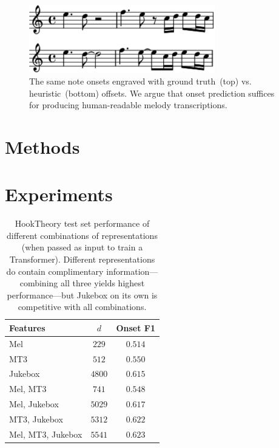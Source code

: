 \documentclass{article}
\newcommand{\mel}{Mel}
\newcommand{\mtthree}{MT3}
\newcommand{\jukebox}{Jukebox}
\newcommand{\hooktheory}{HookTheory}
\begin{document}
\begin{figure}
    \centering
    \includegraphics[width=8.1cm]{figs/heuristic_offsets.pdf}
    \caption{
The same note onsets engraved with ground truth~(top) vs. heuristic~(bottom) offsets. 
We argue that onset prediction suffices for producing human-readable melody transcriptions.
}
 \label{fig:heuristic_offsets}
\end{figure}

\section{Methods}

\section{Experiments}

\begin{table}[]
    \centering
    \begin{tabular}{lcc}
\toprule
Features & $d$ & Onset F1 \\
\midrule
\mel{} & $229$ & $0.514$ \\
\mtthree{} & $512$ & $0.550$ \\
\jukebox{} & $4800$ & $0.615$ \\
\mel{}, \mtthree{} & $741$ & $0.548$ \\
\mel{}, \jukebox{} & $5029$ & $0.617$ \\
\mtthree{}, \jukebox{} & $5312$ & $0.622$ \\
\mel{}, \mtthree{}, \jukebox{} & $5541$ & $\mathbf{0.623}$ \\
\bottomrule
    \end{tabular}
    \caption{\hooktheory{} test set performance of different combinations of representations (when passed as input to train a Transformer). Different representations do contain complimentary information---combining all three yields highest performance---but Jukebox on its own is competitive with all combinations.}
    \label{tab:hooktheory_test}
\end{table}
\end{document}
